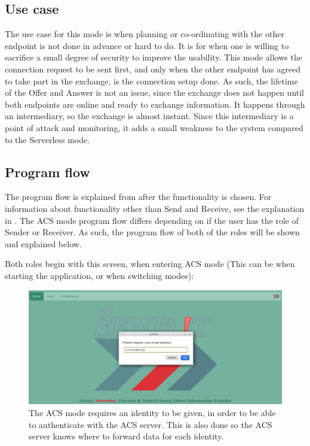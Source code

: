 \subsection{Use case}
%
The use case for this mode is when planning or co-ordinating with the other endpoint is not done in advance or hard to do. It is for when one is willing to sacrifice a small degree of security to improve the usability. This mode allows the connection request to be sent first, and only when the other endpoint has agreed to take part in the exchange, is the connection setup done. As such, the lifetime of the Offer and Answer is not an issue, since the exchange does not happen until both endpoints are online and ready to exchange information. It happens through an intermediary, so the exchange is almost instant. Since this intermediary is a point of attack and monitoring, it adds a small weakness to the system compared to the Serverless mode.
%
\subsection{Program flow}
%
The program flow is explained from after the functionality is chosen. For information about functionality other than Send and Receive, see the explanation in .
The ACS mode program flow differs depending on if the user has the role of Sender or Receiver. As such, the program flow of both of the roles will be shown and explained below.

Both roles begin with this screen, when entering ACS mode (This can be when starting the application, or when switching modes):
%
\begin{figure}[H]
  \centering
  \includegraphics[width=\textwidth]{Figures/ACS/pop_up}
  \decoRule
  \caption[ACS mode: Identity selection screen]{The ACS mode requires an identity to be given, in order to be able to authenticate with the ACS server. This is also done so the ACS server knows where to forward data for each identity.}
  \label{fig:ACS_pop}
\end{figure}
%
\pagebreak
%
